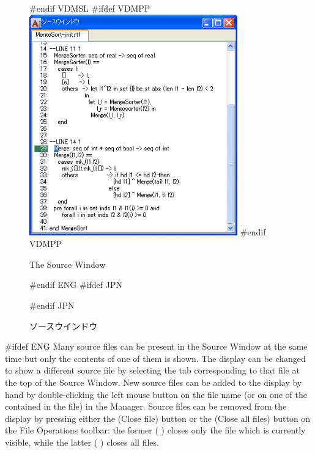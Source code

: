 \documentclass[\pformat,12pt]{article}
\newcommand{\guicmd}[1]{{\sf #1}}
\newcommand{\guicmd}[1]{{\gt #1}}
\begin{document}
\begin{figure}[tbh]
\begin{center}
#endif VDMSL
#ifdef VDMPP
\includegraphics[width=9cm]{sourceWindow-pp.png}
#endif VDMPP
\caption{The Source Window}
#endif ENG
#ifdef JPN
\caption{ソースウインドウ}
#endif JPN
\label{fig:source2}
\end{center}
\end{figure}

#ifdef ENG
Many source files can be present in the \guicmd{Source Window} at the
same time but only the contents of one of them is shown. The display
can be changed to show a different source file by selecting the tab
corresponding to that file at the top of the \guicmd{Source
  Window}. New source files can be added to the display by hand by
double-clicking the left mouse button on the file name (or on one of
the  contained in the
file) in the \guicmd{Manager}. Source files can be removed from the
display by pressing either the 
(\guicmd{Close file}) button or the 
(\guicmd{Close all files}) button on the \guicmd{File Operations}
toolbar: the former (%
)
closes only the file which is currently visible, while the latter (%
)
closes all files.
\end{document}
